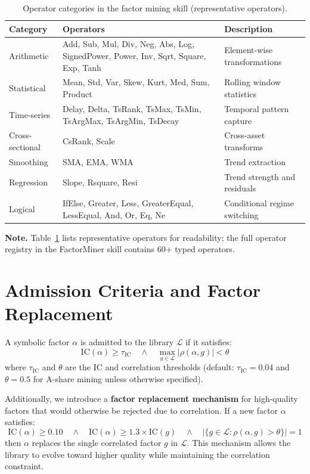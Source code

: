 \documentclass[sigconf]{acmart}
\begin{document}
\begin{table}[h]
  \caption{Operator categories in the factor mining skill (representative operators).}
  \label{tab:operators}
  \centering
  \begin{small}
  \begin{tabular}{p{2.6cm}p{9.6cm}p{3.2cm}}
    \toprule
    Category & Operators & Description \\
    \midrule
    Arithmetic & Add, Sub, Mul, Div, Neg, Abs, Log, SignedPower, Power, Inv, Sqrt, Square, Exp, Tanh & Element-wise transformations \\
    Statistical & Mean, Std, Var, Skew, Kurt, Med, Sum, Product & Rolling window statistics \\
    Time-series & Delay, Delta, TsRank, TsMax, TsMin, TsArgMax, TsArgMin, TsDecay & Temporal pattern capture \\
    Cross-sectional & CsRank, Scale & Cross-asset transforms \\
    Smoothing & SMA, EMA, WMA & Trend extraction \\
    Regression & Slope, Rsquare, Resi & Trend strength and residuals \\
    Logical & IfElse, Greater, Less, GreaterEqual, LessEqual, And, Or, Eq, Ne & Conditional regime switching \\
    \bottomrule
  \end{tabular}
  \end{small}
\end{table}

\noindent\textbf{Note.} Table~\ref{tab:operators} lists representative operators for readability; the full operator registry in the FactorMiner skill contains 60+ typed operators.

\section{Admission Criteria and Factor Replacement}
\label{app:admission}

A symbolic factor $\alpha$ is admitted to the library $\mathcal{L}$ if it satisfies:
\begin{equation}
  \text{IC}(\alpha) \geq \tau_{\text{IC}} \quad \land \quad \max_{g \in \mathcal{L}} |\rho(\alpha, g)| < \theta
\end{equation}
where $\tau_{\text{IC}}$ and $\theta$ are the IC and correlation thresholds (default: $\tau_{\text{IC}}=0.04$ and $\theta=0.5$ for A-share mining unless otherwise specified).

Additionally, we introduce a \textbf{factor replacement mechanism} for high-quality factors that would otherwise be rejected due to correlation.
If a new factor $\alpha$ satisfies:
\begin{equation}
  \text{IC}(\alpha) \geq 0.10 \quad \land \quad \text{IC}(\alpha) \geq 1.3 \times \text{IC}(g) \quad \land \quad |\{g \in \mathcal{L} : \rho(\alpha, g) > \theta\}| = 1
\end{equation}
then $\alpha$ replaces the single correlated factor $g$ in $\mathcal{L}$.
This mechanism allows the library to evolve toward higher quality while maintaining the correlation constraint.
\end{document}
